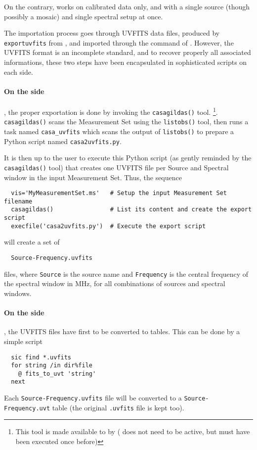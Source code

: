 On the contrary, \imager{} works on calibrated data only, and
with a single source (though possibly a mosaic) and single spectral setup at once.

The importation process goes through UVFITS data files, produced by
\texttt{exportuvfits} from \casa{}, and imported through the 
command of \sic{}.  However, the UVFITS format is an incomplete standard, and 
to recover properly all associated informations, these two steps have
been encapsulated in sophisticated scripts on each side.

\paragraph{On the \casa{} side}, the proper exportation is done by invoking the 
\texttt{casagildas()} tool.  
\footnote{This tool is made available to \casa{} by 
\imager{}  (\imager{} does not need to be active, but must have been 
executed once before)}. \texttt{casagildas()} scans the Measurement Set 
using the \texttt{listobs()} tool, then runs a \gildas{} task named 
\texttt{casa\_uvfits} which scans the output of 
\texttt{listobs()} to prepare a Python script named  
\texttt{casa2uvfits.py}.

It is then up to the user to execute this Python script (as gently 
reminded by the  \texttt{casagildas()} tool) that creates one UVFITS 
file per Source and Spectral window in the input Measurement Set. Thus, 
the sequence
\begin{verbatim}
  vis='MyMeasurementSet.ms'   # Setup the input Measurement Set filename
  casagildas()                # List its content and create the export script
  execfile('casa2uvfits.py')  # Execute the export script
\end{verbatim}
will create a set of
\begin{verbatim}
  Source-Frequency.uvfits
\end{verbatim}
files, where \texttt{Source} is the source name and \texttt{Frequency} is 
the central frequency of the spectral window in MHz, for all combinations
of sources and spectral windows.


\paragraph{On the \imager{} side}, the UVFITS files have first to be
converted to \uv{} tables. This can be done by a simple script
\begin{verbatim}
  sic find *.uvfits
  for string /in dir%file
    @ fits_to_uvt 'string'
  next
\end{verbatim}
Each \texttt{Source-Frequency.uvfits} file will be converted to a 
\texttt{Source-Frequency.uvt} \uv{} table (the original 
\texttt{.uvfits} file is kept too).

